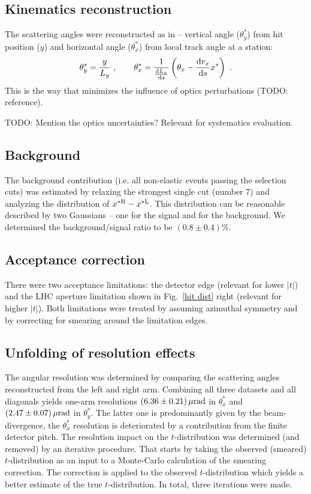 \documentclass[doublecol]{../macros/epl2}
\def\d{{\rm d}}
\def\un#1{\,{\rm #1}}
\begin{document}
\subsection{Kinematics reconstruction}

The scattering angles were reconstructed as in \cite{epl96} -- vertical angle ($\theta^*_y$) from hit position ($y$) and horizontal angle ($\theta^*_x$) from local track angle at a station:
\begin{equation}
\label{reconstruction}
\theta^*_y = {y\over L_y}\ ,\qquad
\theta^*_x = {1\over {\d L_x\over \d s}} \left( \theta_x - {\d v_x\over \d s} x^* \right)\ .
\end{equation}
This is the way that minimizes the influence of optics perturbations (TODO: reference).

TODO: Mention the optics uncertainties? Relevant for systematics evaluation.


\subsection{Background}

The background contribution (i.e. all non-elastic events passing the selection cuts) was estimated by relaxing the strongest single cut (number 7) and analyzing the distribution of $x^{*\rm R} - x^{*\rm L}$. This distribution can be reasonable described by two Gaussians -- one for the signal and for the background. We determined the background/signal ratio to be $(0.8 \pm 0.4)\%$.

\subsection{Acceptance correction}

There were two acceptance limitations: the detector edge (relevant for lower $|t|$) and the LHC aperture limitation shown in Fig.~\ref{hit dist} right (relevant for higher $|t|$). Both limitations were treated by assuming azimuthal symmetry and by correcting for smearing around the limitation edges.

\subsection{Unfolding of resolution effects}

The angular resolution was determined by comparing the scattering angles reconstructed from the left and right arm. Combining all three datasets and all diagonals yields one-arm resolutions $(6.36\pm 0.21)\un{\mu rad}$ in $\theta^*_x$ and $(2.47\pm 0.07)\un{\mu rad}$ in $\theta^*_y$. The latter one is predominantly given by the beam-divergence, the $\theta^*_x$ resolution is deteriorated by a contribution from the finite detector pitch. The resolution impact on the $t$-distribution was determined (and removed) by an iterative procedure. That starts by taking the observed (smeared) $t$-distribution as an input to a Monte-Carlo calculation of the smearing correction. The correction is applied to the observed $t$-distribution which yields a better estimate of the true $t$-distribution. In total, three iterations were made.
\end{document}
